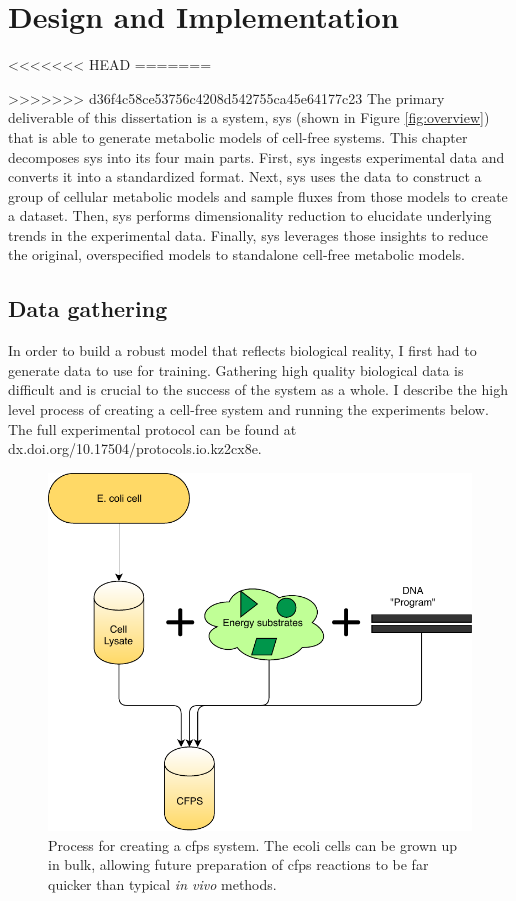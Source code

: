 \chapter{Design and Implementation} \label{chap:impl}

<<<<<<< HEAD
=======

>>>>>>> d36f4c58ce53756c4208d542755ca45e64177c23
The primary deliverable of this dissertation is a system, \gls{sys} (shown in Figure \ref{fig:overview}) that is able to generate metabolic models of cell-free systems.
This chapter decomposes \gls{sys} into its four main parts.
First, \gls{sys} ingests experimental data and converts it into a standardized format.
Next, \gls{sys} uses the data to construct a group of cellular metabolic models and sample fluxes from those models to create a dataset.
Then, \gls{sys} performs dimensionality reduction to elucidate underlying trends in the experimental data.
Finally, \gls{sys} leverages those insights to reduce the original, overspecified models to standalone cell-free metabolic models.

\section{Data gathering}
In order to build a robust model that reflects biological reality, I first had to generate data to use for training.
Gathering high quality biological data is difficult and is crucial to the success of the system as a whole.
I describe the high level process of creating a cell-free system and running the experiments below.
The full experimental protocol can be found at dx.doi.org/10.17504/protocols.io.kz2cx8e.

\begin{figure}[t!]
\begin{center}
\includegraphics{figs/CellFreeSetup.pdf}
\caption[Process for creating a \gls{cfps} system]{Process for creating a \gls{cfps} system.
The \gls{ecoli} cells can be grown up in bulk, allowing future preparation of \gls{cfps} reactions to be far quicker than typical \textit{in vivo} methods.
}
\end{center}
\label{fig:cfps}
\end{figure}

